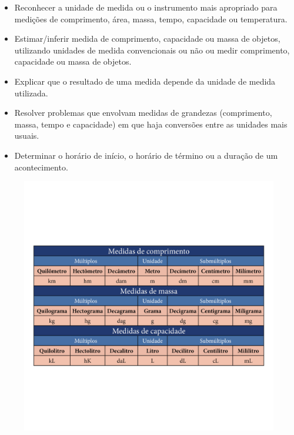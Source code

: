 

\begin{itemize}
\item Reconhecer a unidade de medida ou o instrumento mais apropriado para
medições de comprimento, área, massa, tempo, capacidade ou temperatura.

\item Estimar/inferir medida de comprimento, capacidade ou massa de objetos,
utilizando unidades de medida convencionais ou não ou medir comprimento,
capacidade ou massa de objetos.

\item Explicar que o resultado de uma medida depende da unidade de medida utilizada.

\item Resolver problemas que envolvam medidas de grandezas (comprimento,
massa, tempo e capacidade) em que haja conversões entre as unidades mais
usuais.

\item Determinar o horário de início, o horário de término ou a duração de
um acontecimento.
\end{itemize}


\begin{figure}[htpb!]
\includegraphics[width=\textwidth]{../ilustracoes/MAT5/SAEB_5ANO_MAT_figura30_1.png}
\end{figure}

